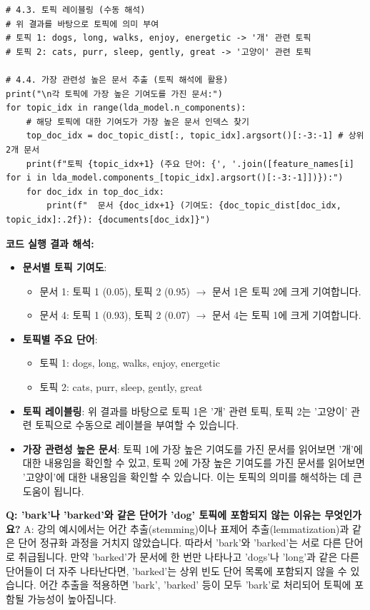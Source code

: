 \documentclass[11pt,a4paper]{article}
\begin{document}
\begin{lstlisting}[caption={Python을 이용한 LDA 구현 예시}, label={lst:python_lda}]
# 4.3. 토픽 레이블링 (수동 해석)
# 위 결과를 바탕으로 토픽에 의미 부여
# 토픽 1: dogs, long, walks, enjoy, energetic -> '개' 관련 토픽
# 토픽 2: cats, purr, sleep, gently, great -> '고양이' 관련 토픽

# 4.4. 가장 관련성 높은 문서 추출 (토픽 해석에 활용)
print("\n각 토픽에 가장 높은 기여도를 가진 문서:")
for topic_idx in range(lda_model.n_components):
    # 해당 토픽에 대한 기여도가 가장 높은 문서 인덱스 찾기
    top_doc_idx = doc_topic_dist[:, topic_idx].argsort()[:-3:-1] # 상위 2개 문서
    print(f"토픽 {topic_idx+1} (주요 단어: {', '.join([feature_names[i] for i in lda_model.components_[topic_idx].argsort()[:-3:-1]])}):")
    for doc_idx in top_doc_idx:
        print(f"  문서 {doc_idx+1} (기여도: {doc_topic_dist[doc_idx, topic_idx]:.2f}): {documents[doc_idx]}")
\end{lstlisting}

\begin{examplebox}
\textbf{코드 실행 결과 해석:}
\begin{itemize}
    \item \textbf{문서별 토픽 기여도}:
    \begin{itemize}
        \item 문서 1: 토픽 1 (0.05), 토픽 2 (0.95) $\rightarrow$ 문서 1은 토픽 2에 크게 기여합니다.
        \item 문서 4: 토픽 1 (0.93), 토픽 2 (0.07) $\rightarrow$ 문서 4는 토픽 1에 크게 기여합니다.
    \end{itemize}
    \item \textbf{토픽별 주요 단어}:
    \begin{itemize}
        \item 토픽 1: dogs, long, walks, enjoy, energetic
        \item 토픽 2: cats, purr, sleep, gently, great
    \end{itemize}
    \item \textbf{토픽 레이블링}: 위 결과를 바탕으로 토픽 1은 '개' 관련 토픽, 토픽 2는 '고양이' 관련 토픽으로 수동으로 레이블을 부여할 수 있습니다.
    \item \textbf{가장 관련성 높은 문서}: 토픽 1에 가장 높은 기여도를 가진 문서를 읽어보면 '개'에 대한 내용임을 확인할 수 있고, 토픽 2에 가장 높은 기여도를 가진 문서를 읽어보면 '고양이'에 대한 내용임을 확인할 수 있습니다. 이는 토픽의 의미를 해석하는 데 큰 도움이 됩니다.
\end{itemize}
\end{examplebox}

\begin{faqbox}
\textbf{Q: 'bark'나 'barked'와 같은 단어가 'dog' 토픽에 포함되지 않는 이유는 무엇인가요?}
A: 강의 예시에서는 어간 추출(stemming)이나 표제어 추출(lemmatization)과 같은 단어 정규화 과정을 거치지 않았습니다. 따라서 'bark'와 'barked'는 서로 다른 단어로 취급됩니다. 만약 'barked'가 문서에 한 번만 나타나고 'dogs'나 'long'과 같은 다른 단어들이 더 자주 나타난다면, 'barked'는 상위 빈도 단어 목록에 포함되지 않을 수 있습니다. 어간 추출을 적용하면 'bark', 'barked' 등이 모두 'bark'로 처리되어 토픽에 포함될 가능성이 높아집니다.
\end{faqbox}
\end{document}

